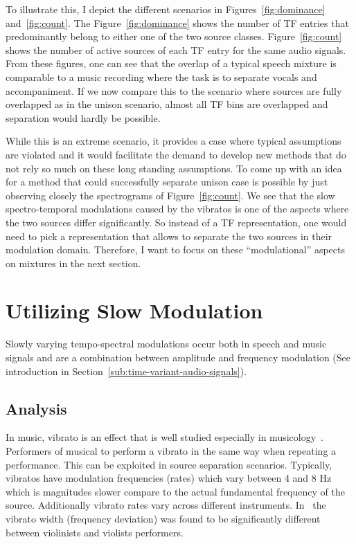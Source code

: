 To illustrate this, I depict the different scenarios in Figures~\ref{fig:dominance} and~\ref{fig:count}.
The Figure~\ref{fig:dominance} shows the number of TF entries that predominantly belong to either one of the two source classes.
Figure~\ref{fig:count} shows the number of active sources of each TF entry for the same audio signals.
From these figures, one can see that the overlap of a typical speech mixture is comparable to a music recording where the task is to separate vocals and accompaniment.
If we now compare this to the scenario where sources are fully overlapped as in the unison scenario, almost all TF bins are overlapped and separation would hardly be possible.
\par
While this is an extreme scenario, it provides a case where typical assumptions are violated and it would facilitate the demand to develop new methods that do not rely so much on these long standing assumptions.
To come up with an idea for a method that could successfully separate unison case is possible by just observing closely the spectrograms of Figure~\ref{fig:count}.
We see that the slow spectro-temporal modulations caused by the vibratos is one of the aspects where the two sources differ significantly.
So instead of a TF representation, one would need to pick a representation that allows to separate the two sources in their modulation domain.
Therefore, I want to focus on these ``modulational'' aspects on mixtures in the next section.

\hypertarget{utilizing-slow-modulations}{%
\section{Utilizing Slow Modulation}\label{utilizing-slow-modulations}}

Slowly varying tempo-spectral modulations occur both in speech and music signals and are a combination between amplitude and frequency modulation (See introduction in Section~\ref{sub:time-variant-audio-signals}).


\subsection{Analysis}
In music, vibrato is an effect that is well studied especially in musicology~\cite{A, B, C, D, E}.
Performers of musical to perform a vibrato in the same way when repeating a performance. This can be exploited in
source separation scenarios.
Typically, vibratos have modulation frequencies (rates) which vary between 4 and 8 Hz which is magnitudes slower compare to the actual fundamental frequency of the source.
Additionally vibrato rates vary across different instruments.
In~\cite{macleod2006} the vibrato width (frequency deviation) was found to be significantly different between violinists and violists performers.\\

